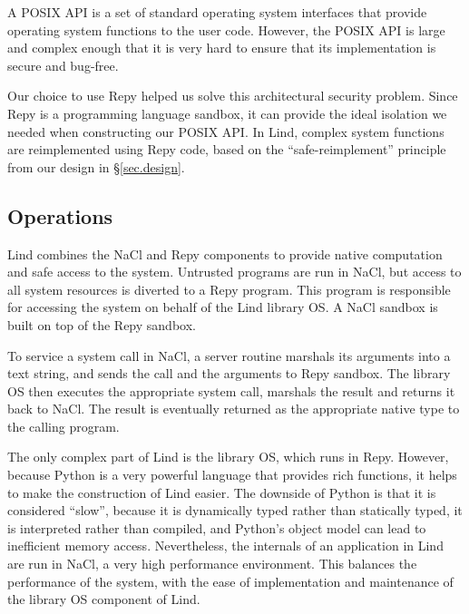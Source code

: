 A POSIX API is a set of standard operating system interfaces that provide operating system functions
to the user code. However, the POSIX API is large and complex enough that it is
very hard to ensure that its implementation is secure and bug-free.

Our choice to use Repy helped us solve this architectural security problem.
Since Repy is a programming language sandbox, it can provide the ideal isolation
we needed when constructing our POSIX API. In Lind,
complex system functions are reimplemented using Repy code,
based on the ``safe-reimplement'' principle from our design in \S{\ref{sec.design}}.

\subsection{Operations}

Lind combines the NaCl and Repy components to provide native computation and
safe access to the system. Untrusted programs are run in NaCl,
but access to all system resources is diverted to a Repy program.
This program is responsible for accessing the system on behalf of the Lind library
 OS. A NaCl sandbox is built on top of the Repy sandbox.

To service a system call in NaCl, a server routine marshals its arguments into a text string,
and sends the call and the arguments to Repy sandbox.
The library OS then executes the appropriate system call, marshals the result and
returns it back to NaCl. The result is eventually returned as the appropriate native type to the calling program.


The only complex part of Lind is the library OS, which runs in Repy.
However, because Python is a very powerful language that provides rich functions,
it helps to make the construction of Lind easier. The downside of Python is that it is considered ``slow'', 
because it is dynamically typed rather than statically typed, it is interpreted rather than compiled, 
and Python's object model can lead to inefficient memory access. 
Nevertheless, the internals of an application in Lind are run in NaCl, a very high performance
environment. 
This balances the performance of the system, with the ease of implementation and maintenance
of the library OS component of Lind.

